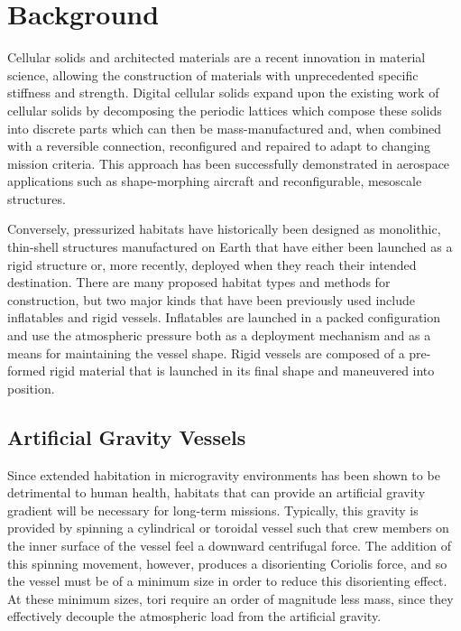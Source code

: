 \documentclass[twocolumn,letterpaper]{IEEEAerospaceCLS}  %
\begin{document}
\section{Background}
Cellular solids and architected materials are a recent innovation in material science, allowing the construction of materials with unprecedented specific stiffness and strength\cite{zheng2014ultralight}. Digital cellular solids expand upon the existing work of cellular solids by decomposing the periodic lattices which compose these solids into discrete parts which can then be mass-manufactured and, when combined with a reversible connection, reconfigured and repaired to adapt to changing mission criteria. This approach has been successfully demonstrated in aerospace applications such as shape-morphing aircraft\cite{jenett2015digital} and reconfigurable, mesoscale structures\cite{jenett2016meso}.


Conversely, pressurized habitats have historically been designed as monolithic, thin-shell structures manufactured on Earth that have either been launched as a rigid structure or, more recently, deployed when they reach their intended destination\cite{seedhouse2015bigelow}. There are many proposed habitat types and methods for construction, but two major kinds that have been previously used include inflatables and rigid vessels. Inflatables are launched in a packed configuration and use the atmospheric pressure both as a deployment mechanism and as a means for maintaining the vessel shape. Rigid vessels are composed of a pre-formed rigid material that is launched in its final shape and maneuvered into position.

\subsection{Artificial Gravity Vessels}
Since extended habitation in microgravity environments has been shown to be detrimental to human health\cite{blaber2010bioastronautics}, habitats that can provide an artificial gravity gradient will be necessary for long-term missions. Typically, this gravity is provided by spinning a cylindrical or toroidal vessel such that crew members on the inner surface of the vessel feel a downward centrifugal force. The addition of this spinning movement, however, produces a disorienting Coriolis force, and so the vessel must be of a minimum size in order to reduce this disorienting effect\cite{stone1973overview}. At these minimum sizes, tori require an order of magnitude less mass, since they effectively decouple the atmospheric load from the artificial gravity\cite{o1977space}. 
\end{document}
